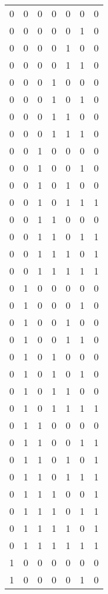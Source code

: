 \begin{longtable}[c]{rrrrrrr}
        0 & 0 & 0 & 0 & 0 & 0 & 0 \\
        0 & 0 & 0 & 0 & 0 & 1 & 0 \\
        0 & 0 & 0 & 0 & 1 & 0 & 0 \\
        0 & 0 & 0 & 0 & 1 & 1 & 0 \\
        0 & 0 & 0 & 1 & 0 & 0 & 0 \\
        0 & 0 & 0 & 1 & 0 & 1 & 0 \\
        0 & 0 & 0 & 1 & 1 & 0 & 0 \\
        0 & 0 & 0 & 1 & 1 & 1 & 0 \\
        0 & 0 & 1 & 0 & 0 & 0 & 0 \\
        0 & 0 & 1 & 0 & 0 & 1 & 0 \\
        0 & 0 & 1 & 0 & 1 & 0 & 0 \\
        0 & 0 & 1 & 0 & 1 & 1 & 1 \\
        0 & 0 & 1 & 1 & 0 & 0 & 0 \\
        0 & 0 & 1 & 1 & 0 & 1 & 1 \\
        0 & 0 & 1 & 1 & 1 & 0 & 1 \\
        0 & 0 & 1 & 1 & 1 & 1 & 1 \\
        0 & 1 & 0 & 0 & 0 & 0 & 0 \\
        0 & 1 & 0 & 0 & 0 & 1 & 0 \\
        0 & 1 & 0 & 0 & 1 & 0 & 0 \\
        0 & 1 & 0 & 0 & 1 & 1 & 0 \\
        0 & 1 & 0 & 1 & 0 & 0 & 0 \\
        0 & 1 & 0 & 1 & 0 & 1 & 0 \\
        0 & 1 & 0 & 1 & 1 & 0 & 0 \\
        0 & 1 & 0 & 1 & 1 & 1 & 1 \\
        0 & 1 & 1 & 0 & 0 & 0 & 0 \\
        0 & 1 & 1 & 0 & 0 & 1 & 1 \\
        0 & 1 & 1 & 0 & 1 & 0 & 1 \\
        0 & 1 & 1 & 0 & 1 & 1 & 1 \\
        0 & 1 & 1 & 1 & 0 & 0 & 1 \\
        0 & 1 & 1 & 1 & 0 & 1 & 1 \\
        0 & 1 & 1 & 1 & 1 & 0 & 1 \\
        0 & 1 & 1 & 1 & 1 & 1 & 1 \\
        1 & 0 & 0 & 0 & 0 & 0 & 0 \\
        1 & 0 & 0 & 0 & 0 & 1 & 0 \\

\end{longtable}

